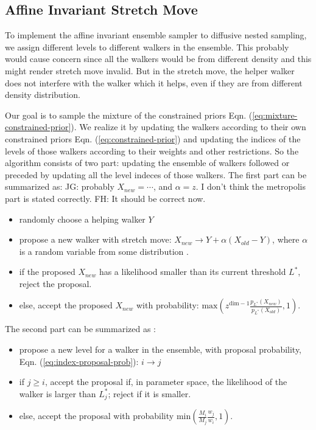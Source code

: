 \documentclass[letterpaper, preprint]{aastex}
\newcommand{\qer}[1]{{\color{red}#1}}
\begin{document}
\subsection{Affine Invariant Stretch Move}
To implement the affine invariant ensemble sampler to diffusive nested sampling, we assign different levels to different walkers in the ensemble. This probably would cause concern since all the walkers would be from different density and this might render stretch move invalid. But in the stretch move, the helper walker does not interfere with the walker which it helps, even if they are from different density distribution. 

Our goal is to sample the mixture of the constrained priors Eqn. (\ref{eq:mixture-constrained-prior}). We realize it by updating the walkers according to their own constrained priors Eqn. (\ref{eq:constrained-prior}) and updating the indices of the levels of those walkers according to their weights and other restrictions. So the algorithm consists of two part: updating the ensemble of walkers followed or preceded by updating all the level indeces of those walkers. The first part can be summarized as:
\qer{JG: probably $X_{new} = \cdots$, and $\alpha=z$.  I don't think the 
metropolis part is stated correctly.} \qer{FH: It should be correct now.}
\begin{sffamily}
\begin{itemize}
\item randomly choose a helping walker $Y$
\item propose a new walker with stretch move: $X_{new} \rightarrow Y + \alpha (X_{old}-Y)$, where $\alpha$ is a random variable from some distribution \citep{goodman10a}.
\item if the proposed $X_{new}$ has a likelihood smaller than its current threshold $L^*$, reject the proposal.
\item else, accept the proposed $X_{new}$ with probability: $\mathrm{max}\left(z^{\mathrm{dim}-1}\frac{p_{L^*}(X_{new})}{p_{L^*}(X_{old})},1\right)$.
\end{itemize}
\end{sffamily}
The second part can be summarized as \citep{brewer11a}:
\begin{sffamily}
\begin{itemize}
\item propose a new level for a walker in the ensemble, with proposal probability, Eqn. (\ref{eq:index-proposal-prob}): $i \rightarrow j$
\item if $j \geq i$, accept the proposal if, in parameter space, the likelihood of the walker is larger than $L_j^*$; reject if it is smaller.
\item else, accept the proposal with probability $\mathrm{min}\left(\frac{M_i}{M_j}\frac{w_j}{w_i},1\right)$.
\end{itemize}
\end{sffamily}
\end{document}
